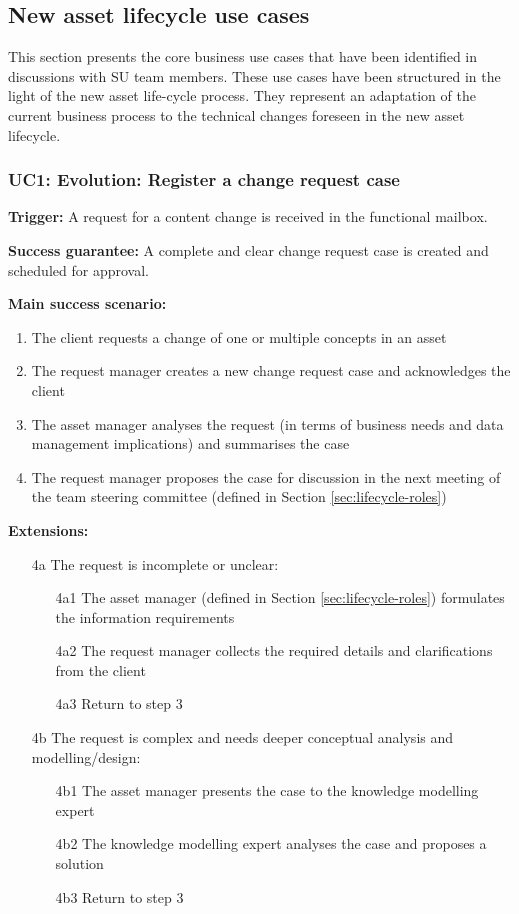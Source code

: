     \subsection{New asset lifecycle use cases}
    \label{sec:business-use cases}
	
	This section presents the core business use cases that have been identified in discussions with SU team members. These use cases have been structured in the light of the new asset life-cycle process. They represent an adaptation of the current business process to the technical changes foreseen in the new asset lifecycle.
	
	\subsubsection{UC1: Evolution: Register a change request case}
	\label{sec:uc1}
	
	\textbf{Trigger:} A request for a content change is received in the functional mailbox.
	
	\textbf{Success guarantee:} A complete and clear change request case is created and scheduled for approval.
	
	\textbf{Main success scenario:}
	
	\begin{enumerate}
		\item The client requests a change of one or multiple concepts in an asset
		\item The request manager creates a new change request case and acknowledges the client
		\item The asset manager analyses the request (in terms of business needs and data management implications) and summarises the case
		\item The request manager proposes the case for discussion in the next meeting of the team steering committee (defined in Section \ref{sec:lifecycle-roles})		
	\end{enumerate}
	\textbf{Extensions:}
	\begin{enumerate}
		\item [4a] The request is incomplete or unclear:
		\begin{enumerate}
			\item [4a1] The asset manager (defined in Section \ref{sec:lifecycle-roles}) formulates the information requirements			
			\item [4a2] The request manager collects the required details and clarifications from the client
			\item [4a3] Return to step 3 
		\end{enumerate}
		\item [4b] The request is complex and needs deeper conceptual analysis and modelling/design:
		\begin{enumerate}
			\item [4b1] The asset manager presents the case to the knowledge modelling expert 
			\item [4b2] The knowledge modelling expert analyses the case and proposes a solution
			\item [4b3] Return to step 3			
		\end{enumerate}
	\end{enumerate}
	
